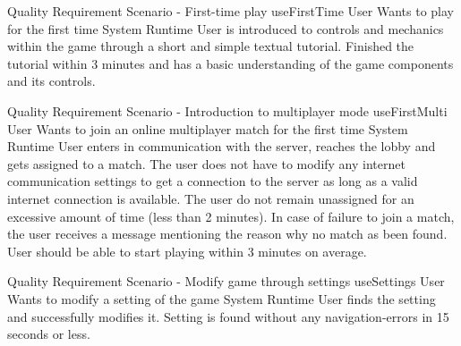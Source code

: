 
{Quality Requirement Scenario - First-time play}
{useFirstTime}
{User}
{Wants to play for the first time}
{System}
{Runtime}
{User is introduced to controls and mechanics within the game through
a short and simple textual tutorial.}
{Finished the tutorial within 3 minutes and has a basic understanding of the game components and its controls.}

{Quality Requirement Scenario - Introduction to multiplayer mode}
{useFirstMulti}
{User}
{Wants to join an online multiplayer match for the first time}
{System}
{Runtime}
{User enters in communication with the server, reaches the lobby and gets assigned to a match.}
{The user does not have to modify any internet communication settings to get a connection to the server as long as a valid internet connection is available. The user do not remain unassigned for an excessive amount of time (less than 2 minutes). In case of failure to join a match, the user receives a message mentioning the reason why no match as been found. User should be able to start playing within 3 minutes on average.}

{Quality Requirement Scenario - Modify game through settings}
{useSettings}
{User}
{Wants to modify a setting of the game}
{System}
{Runtime}
{User finds the setting and successfully modifies it.}
{Setting is found without any navigation-errors in 15 seconds or less.}


